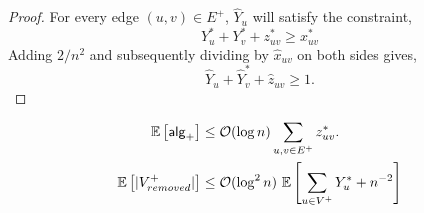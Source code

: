 	\begin{proof}
	For every edge $(u,v) \in E^+$, $\hat{Y}_u$ will satisfy the constraint,
	\begin{equation*}
        Y_u^* + Y_v^* + z^*_{uv} \ge x_{uv}^*
    \end{equation*}
    Adding $2/n^2$ and subsequently dividing by $\hat{x}_{uv}$ on both sides gives,
    \begin{equation*}
	    \hat{Y}_u + \hat{Y}_v^* + \hat{z}_{uv} \ge 1.
	\end{equation*}
	\end{proof}

	\begin{lemma} \label{lemma:003}
	\begin{align*}
	    \mathbb{E} \left[ \mathsf{alg}_+ \right] &\le \mathcal{O} (\log n) \sum_{u,v \in E^+} z_{uv}^*.\\
	    \mathbb{E} \left[ |V_{removed}^+| \right] &\le \mathcal{O} (\log^2 n)\ \mathbb{E} \left[ \sum_{u \in V^+} Y_u^* + n^{-2} \right]
	\end{align*}
	\end{lemma}
